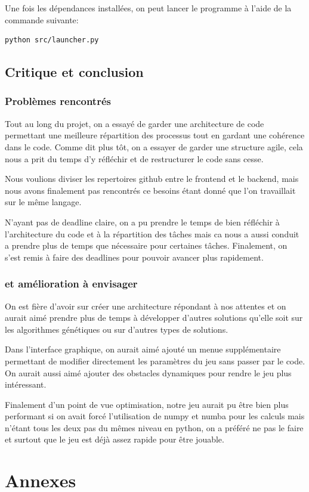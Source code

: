 \documentclass[french,a4paper,10pt,twocolumn]{article}
\begin{document}
Une fois les dépendances installées, on peut lancer le programme à l'aide de la commande suivante:
\begin{lstlisting}[style=bash]
    python src/launcher.py
\end{lstlisting}

\subsection{Critique et conclusion}
\subsubsection{Problèmes rencontrés}

Tout au long du projet, on a essayé de garder une architecture de code permettant une meilleure répartition des processus
tout en gardant une cohérence dans le code. 
Comme dit plus tôt, on a essayer de garder une structure agile, cela nous a prit du temps d'y réfléchir et de restructurer le code sans cesse.

Nous voulions diviser les repertoires github entre le frontend et le backend, mais nous avons finalement pas rencontrés ce besoins étant donné
que l'on travaillait sur le même langage. 

N'ayant pas de deadline claire, on a pu prendre le temps de bien réfléchir à l'architecture du code et à la répartition des tâches mais 
ca nous a aussi conduit a prendre plus de temps que nécessaire pour certaines tâches.
Finalement, on s'est remis à faire des deadlines pour pouvoir avancer plus rapidement.

\subsubsection{et amélioration à envisager}

On est fière d'avoir sur créer une architecture répondant à nos attentes et on aurait aimé prendre plus de temps à développer d'autres solutions 
qu'elle soit sur les algorithmes génétiques ou sur d'autres types de solutions.

Dans l'interface graphique, on aurait aimé ajouté un menue supplémentaire permettant de modifier directement les paramètres du jeu sans passer par le code.
On aurait aussi aimé ajouter des obstacles dynamiques pour rendre le jeu plus intéressant.

Finalement d'un point de vue optimisation, notre jeu aurait pu être bien plus performant si on avait forcé l'utilisation de numpy et numba pour les calculs 
mais n'étant tous les deux pas du mêmes niveau en python, on a préféré ne pas le faire et surtout que le jeu est déjà assez rapide pour être jouable.


\section{Annexes}

\printbibliography
\end{document}
